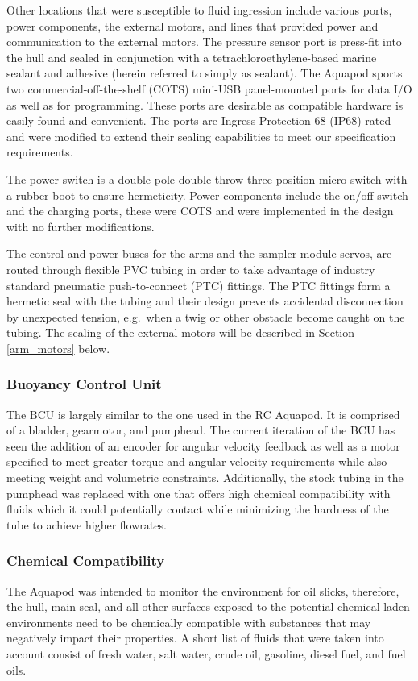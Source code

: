 Other locations that were susceptible to fluid ingression include various ports, power components, the external motors, and lines that provided power and communication to the external motors. The pressure sensor port is press-fit into the hull and sealed in conjunction with a tetrachloroethylene-based marine sealant and adhesive (herein referred to simply as sealant). The Aquapod sports two commercial-off-the-shelf (COTS) mini-USB panel-mounted ports for data I/O as well as for programming.  These ports are desirable as compatible hardware is easily found and convenient. The ports are Ingress Protection 68 (IP68) rated and were modified to extend their sealing capabilities to meet our specification requirements. 

The power switch is a double-pole double-throw three position micro-switch with a rubber boot to ensure hermeticity. Power components include the on/off switch and the charging ports, these were COTS and were implemented in the design with no further modifications. 

The control and power buses for the arms and the sampler module servos, are routed through flexible PVC tubing in order to take advantage of industry standard pneumatic push-to-connect (PTC) fittings.  The PTC fittings form a hermetic seal with the tubing and their design prevents accidental disconnection by unexpected tension, e.g.\ when a twig or other obstacle become caught on the tubing. The sealing of the external motors will be described in Section \ref{arm_motors} below. 

\subsubsection{Buoyancy Control Unit}
The BCU is largely similar to the one used in the RC Aquapod. It is comprised of a bladder, gearmotor, and pumphead.  The current iteration of the BCU has seen the addition of an encoder for angular velocity feedback as well as a motor specified to meet greater torque and angular velocity requirements while also meeting weight and volumetric constraints.  Additionally, the stock tubing in the pumphead was replaced with one that offers high chemical compatibility with fluids which it could potentially contact while minimizing the hardness of the tube to achieve higher flowrates. 

\subsubsection{Chemical Compatibility}
The Aquapod was intended to monitor the environment for oil slicks, therefore, the hull, main seal, and all other surfaces exposed to the potential chemical-laden environments need to be chemically compatible with substances that may negatively impact their properties. A short list of fluids that were taken into account consist of fresh water, salt water, crude oil, gasoline, diesel fuel, and fuel oils.


